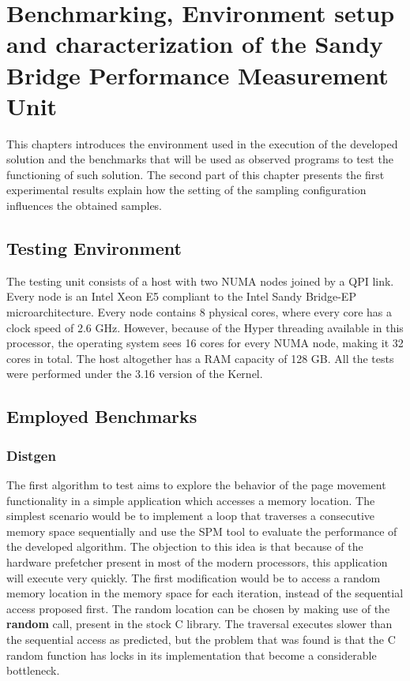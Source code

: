 \chapter[Benchmarking, Environment Setup and Characterization of the PMU]{Benchmarking, Environment setup and characterization of the Sandy Bridge Performance Measurement Unit}\label{chapter:envsetup}

This chapters introduces the environment used in the execution of the developed solution and the benchmarks that will be used as observed programs to test the functioning of such solution. The second part of this chapter presents the first experimental results explain how the setting of the sampling configuration influences the obtained samples.

\section{Testing Environment}\label{section:runningenv}
The testing unit consists of a host with two NUMA nodes joined by a QPI link. Every node is an Intel Xeon E5 compliant to the Intel Sandy Bridge-EP microarchitecture. Every node contains 8 physical cores, where every core has a clock speed of 2.6 GHz. However, because of the Hyper threading available in this processor, the operating system sees 16 cores for every NUMA node, making it 32 cores in total. The host altogether has a RAM capacity of 128 GB. All the tests were performed under the 3.16 version of the Kernel.

\section{Employed Benchmarks}\label{section:emplybmchs}

\subsection{Distgen}\label{section:distgen}
The first algorithm to test aims to explore the behavior of the page movement functionality in a simple application which accesses a memory location. The simplest scenario would be to implement a loop that traverses a consecutive memory space sequentially and use the SPM tool to evaluate the performance of the developed algorithm. The objection to this idea is that because of the hardware prefetcher present in most of the modern processors, this application will execute very quickly. The first modification would be to access a random memory location in the memory space for each iteration, instead of the sequential access proposed first. The random location can be chosen by making use of the \textbf{random} call, present in the stock C library. The traversal executes slower than the sequential access as predicted, but the problem that was found is that the C random function has locks in its implementation that become a considerable bottleneck.

